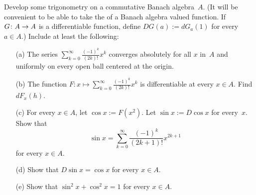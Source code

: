 \begin{prob} Develop some trigonometry on a commutative Banach algebra~$A$.  (It will be convenient
to be able to take the
 of a Banach algebra valued function.  If $G \colon A \rightarrow A$ is a
differentiable function, define $DG(a) := dG_a(1)$ for every $a \in A$.)  Include at least the
following:
\begin{enumerate}
  \item[(a)] The series $\sum_{k=0}^\infty \frac{(-1)^k}{(2k)!}x^k$ converges absolutely for all
$x$ in~$A$ and uniformly on every open ball centered at the origin.
  \item[(b)] The function $F\colon x \mapsto \sum_{k=0}^\infty \frac{(-1)^k}{(2k)!}x^k$ is
differentiable at every $x \in A$.   Find $dF_x(h)$.
  \item[(c)] For every $x\in A$, let $\cos x := F(x^2)$.  Let $\sin x := D\cos x$ for every~$x$.
Show that
    \[ \sin x = \sum_{k=0}^\infty \frac{(-1)^k}{(2k+1)!}x^{2k+1} \]
for every $x \in A$.
  \item[(d)] Show that $D\sin x = \cos x$ for every $x \in A$.
  \item[(e)] Show that $\sin^2 x + \cos^2 x = 1$ for every $x \in
  A$.
\end{enumerate}
\end{prob}




\endinput
